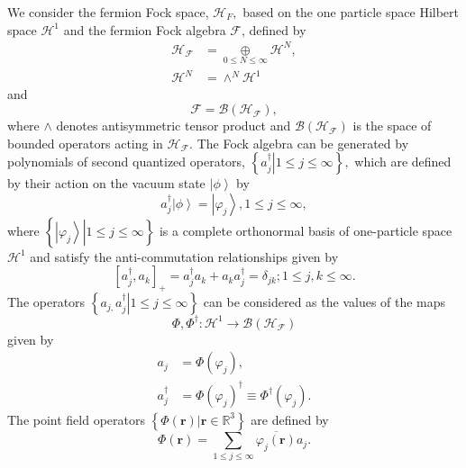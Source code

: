 \documentclass[aps,preprint]{revtex4}%
\begin{document}
We consider the fermion Fock space, $\mathcal{H}_{F},$ based on the one
particle space Hilbert space $\mathcal{H}^{1}$ and the fermion Fock algebra
$\mathcal{F}$, defined by
\begin{align}
\mathcal{H}_{\mathcal{F}}  &  =\underset{0\leq N\leq\infty}{\oplus}%
\mathcal{H}^{N},\\
\mathcal{H}^{N}  &  =\wedge^{N}\mathcal{H}^{1}%
\end{align}
and
\begin{equation}
\mathcal{F}=\mathcal{B}\left(  \mathcal{H}_{\mathcal{F}}\right)  ,
\end{equation}
where $\wedge$ denotes antisymmetric tensor product and $\mathcal{B}\left(
\mathcal{H}_{\mathcal{F}}\right)  $ is the space of bounded operators acting
in $\mathcal{H}_{\mathcal{F}}$. The Fock algebra can be generated by
polynomials of second quantized operators, $\left\{  \left.  a_{j}^{\dagger
}\right\vert 1\leq j\leq\infty\right\}  ,$ which are defined by their action
on the vacuum state $\left\vert \phi\right\rangle $ by
\begin{equation}
a_{j}^{\dagger}\left\vert \phi\right\rangle =\left\vert \varphi_{j}%
\right\rangle ,1\leq j\leq\infty,
\end{equation}
where $\left\{  \left.  \left\vert \varphi_{j}\right\rangle \right\vert 1\leq
j\leq\infty\right\}  $ is a complete orthonormal basis of one-particle space
$\mathcal{H}^{1}$ and satisfy the anti-commutation relationships given by
\begin{equation}
\left[  a_{j}^{\dagger},a_{k}\right]  _{+}=a_{j}^{\dagger}a_{k}+a_{k}%
a_{j}^{\dagger}=\delta_{jk};1\leq j,k\leq\infty.
\end{equation}
The operators $\left\{  \left.  a_{j,}a_{j}^{\dagger}\right\vert 1\leq
j\leq\infty\right\}  $ can be considered as the values of the maps
\begin{equation}
\Phi,\Phi^{\dagger}:\mathcal{H}^{1}\rightarrow\mathcal{B}\left(
\mathcal{H}_{\mathcal{F}}\right)
\end{equation}
given by
\begin{align}
a_{j}  &  =\Phi\left(  \varphi_{j}\right)  ,\nonumber\\
a_{j}^{\dagger}  &  =\Phi\left(  \varphi_{j}\right)  ^{\dagger}\equiv
\Phi^{\dagger}\left(  \varphi_{j}\right)  .
\end{align}
The point field operators $\left\{  \left.  \Phi\left(  \boldsymbol{r}\right)
\right\vert \boldsymbol{r\in}\mathbb{R}^{3}\right\}  $ are defined by
\cite{Thirring}
\begin{equation}
\Phi\left(  \boldsymbol{r}\right)  =\sum_{1\leq j\leq\infty}\overline
{\varphi_{j}\left(  \boldsymbol{r}\right)  }a_{j}.
\end{equation}
\end{document}
